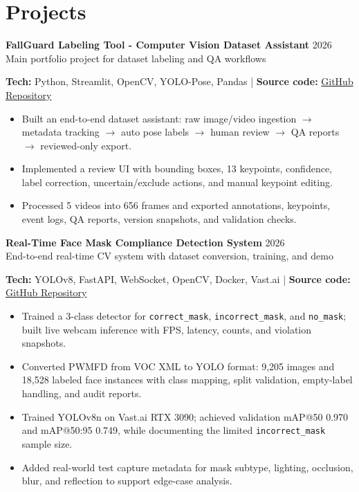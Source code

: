 \documentclass[10pt,a4paper]{article}
\newcommand{\cvproject}[3]{%
  \textbf{#1} \hfill {\small\color{muted}#2}\\
  {\small\color{muted}#3}
}
\newcommand{\techline}[2]{%
  {\small\textbf{Tech:} #1 \quad | \quad \textbf{Source code:} \href{#2}{GitHub Repository}}\\[-2pt]
}
\begin{document}
\section{Projects}
\cvproject
  {FallGuard Labeling Tool - Computer Vision Dataset Assistant}
  {2026}
  {Main portfolio project for dataset labeling and QA workflows}
\techline{Python, Streamlit, OpenCV, YOLO-Pose, Pandas}{https://github.com/NguyenKhacBao564/autofall-labeler-tool.git}
\begin{itemize}
  \item Built an end-to-end dataset assistant: raw image/video ingestion $\rightarrow$ metadata tracking $\rightarrow$ auto pose labels $\rightarrow$ human review $\rightarrow$ QA reports $\rightarrow$ reviewed-only export.
  \item Implemented a review UI with bounding boxes, 13 keypoints, confidence, label correction, uncertain/exclude actions, and manual keypoint editing.
  \item Processed 5 videos into 656 frames and exported annotations, keypoints, event logs, QA reports, version snapshots, and validation checks.
\end{itemize}

\cvproject
  {Real-Time Face Mask Compliance Detection System}
  {2026}
  {End-to-end real-time CV system with dataset conversion, training, and demo}
\techline{YOLOv8, FastAPI, WebSocket, OpenCV, Docker, Vast.ai}{https://github.com/NguyenKhacBao564/Real-Time-Face-Mask-Compliance-Detection-System.git}
\begin{itemize}
  \item Trained a 3-class detector for \texttt{correct\_mask}, \texttt{incorrect\_mask}, and \texttt{no\_mask}; built live webcam inference with FPS, latency, counts, and violation snapshots.
  \item Converted PWMFD from VOC XML to YOLO format: 9,205 images and 18,528 labeled face instances with class mapping, split validation, empty-label handling, and audit reports.
  \item Trained YOLOv8n on Vast.ai RTX 3090; achieved validation mAP@50 0.970 and mAP@50:95 0.749, while documenting the limited \texttt{incorrect\_mask} sample size.
  \item Added real-world test capture metadata for mask subtype, lighting, occlusion, blur, and reflection to support edge-case analysis.
\end{itemize}
\end{document}
